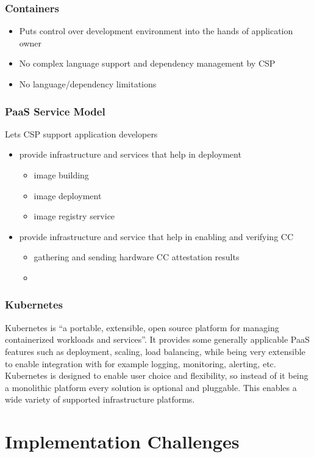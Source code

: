 \subsubsection*{Containers}

\begin{itemize}
  \item Puts control over development environment into the hands of application
        owner
  \item No complex language support and dependency management by CSP
  \item No language/dependency limitations
\end{itemize}

\subsubsection*{PaaS Service Model}

Lets CSP support application developers
\begin{itemize}
  \item provide infrastructure and services that help in deployment
        \begin{itemize}
          \item image building
          \item image deployment
          \item image registry service
        \end{itemize}
  \item provide infrastructure and service that help in enabling and
        verifying CC
        \begin{itemize}
          \item gathering and sending hardware CC attestation results
          \item
        \end{itemize}
\end{itemize}

\subsubsection*{Kubernetes}

Kubernetes is ``a portable, extensible, open source platform for managing
containerized workloads and services''. It provides some generally applicable
PaaS features such as deployment, scaling, load balancing, while being very
extensible to enable integration with for example logging, monitoring, alerting,
etc. Kubernetes is designed to enable user choice and flexibility, so instead of
it being a monolithic platform every solution is optional and pluggable. This
enables a wide variety of supported infrastructure platforms. 

\section{Implementation Challenges}

